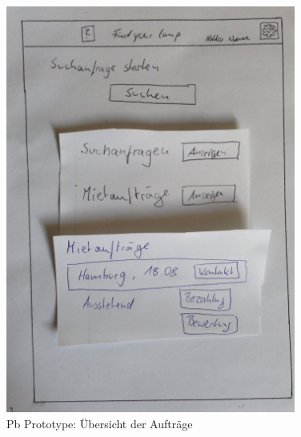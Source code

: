 \begin{figure}[H]
\centering
\includegraphics[angle=90, width=0.85\textwidth]{./images/paperbased/auftraege.JPG}
\caption{Pb Prototype: Übersicht der Aufträge}
\label{pbprototype4}
\end{figure}

